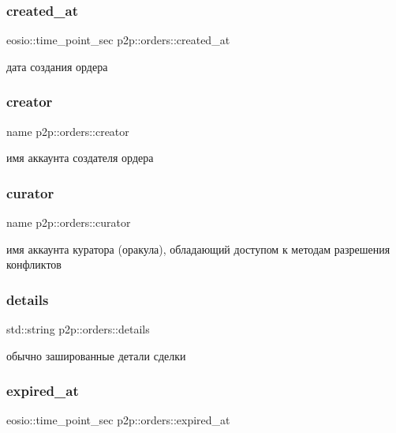 \subsubsection{\texorpdfstring{created\+\_\+at}{created\_at}}
{\footnotesize\ttfamily eosio\+::time\+\_\+point\+\_\+sec p2p\+::orders\+::created\+\_\+at}

дата создания ордера \mbox{\label{structp2p_1_1orders_ae2b7e5411d8ddcd0e7c2be0fbb177686}} 
\subsubsection{\texorpdfstring{creator}{creator}}
{\footnotesize\ttfamily name p2p\+::orders\+::creator}

имя аккаунта создателя ордера \mbox{\label{structp2p_1_1orders_a3f36507a769c0ec66ca553722a842c2a}} 
\subsubsection{\texorpdfstring{curator}{curator}}
{\footnotesize\ttfamily name p2p\+::orders\+::curator}

имя аккаунта куратора (оракула), обладающий доступом к методам разрешения конфликтов \mbox{\label{structp2p_1_1orders_a223eac1f67f878e4bfc3c3918deadcfc}} 
\subsubsection{\texorpdfstring{details}{details}}
{\footnotesize\ttfamily std\+::string p2p\+::orders\+::details}

обычно зашированные детали сделки \mbox{\label{structp2p_1_1orders_afe3f0c2fcb252679efbd4143fc86d42d}} 
\subsubsection{\texorpdfstring{expired\+\_\+at}{expired\_at}}
{\footnotesize\ttfamily eosio\+::time\+\_\+point\+\_\+sec p2p\+::orders\+::expired\+\_\+at}

